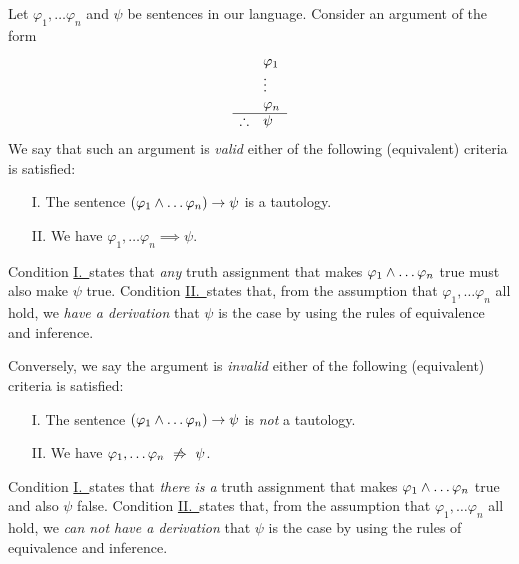 \begin{definition}[Validity]
    Let \(\varphi_1, \dots \varphi_n\) and \(\psi\) be sentences in our language.
    Consider an argument of the form
    \[
    \begin{array}{ r l }
                & \varphi_1 \\
                & \vdots \\
                & \varphi_n \\
        \cline{1-2}
        \therefore & \psi
    \end{array}
    \]
    We say that such an argument is \emph{valid} \iffbydefn
    either of the following (equivalent) criteria is satisfied:
    \begin{enumerate}
        \item[I.]\label{validi}
            The sentence
            \(\pn*{\varphi_1 \meet \dots \varphi_n} \rightarrow \psi\)
            is a tautology.
        \item[II.]\label{validii}
            We have \(\varphi_1, \dots \varphi_n \implies \psi\).
    \end{enumerate}
    Condition \hyperref[validi]{I.\ }states that \emph{any} truth assignment
    that makes \(\varphi_1 \wedge \dots \varphi_n\) true must also make \(\psi\) true.
    Condition \hyperref[validi]{II.\ }states that,
    from the assumption that \(\varphi_1, \dots \varphi_n\) all hold,
    we \emph{have a derivation}
    that \(\psi\) is the case by using the rules of equivalence and inference.
\end{definition}

\begin{definition}[Invalidity]
    Conversely, we say the argument is \emph{invalid} \iffbydefn
    either of the following (equivalent) criteria is satisfied: 
    \begin{enumerate}
        \item[I.]
            The sentence
            \(\pn*{\varphi_1 \meet \dots \varphi_n} \rightarrow \psi\)
            is \emph{not} a tautology.
        \item[II.]
            We have \(\varphi_1, \dots \varphi_n ~\not\Rightarrow~ \psi\).
    \end{enumerate}
    Condition \hyperref[validi]{I.\ }states that \emph{there is a} truth assignment
    that makes \(\varphi_1 \wedge \dots \varphi_n\) true and also \(\psi\) false.
    Condition \hyperref[validi]{II.\ }states that,
    from the assumption that \(\varphi_1, \dots \varphi_n\) all hold,
    we \emph{can not have a derivation}
    that \(\psi\) is the case by using the rules of equivalence and inference.
\end{definition}

